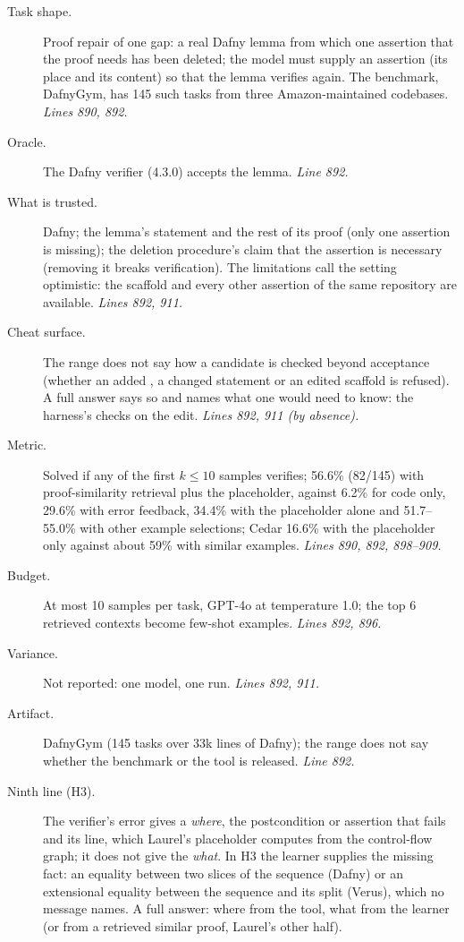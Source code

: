 \documentclass[11pt]{article}
\begin{document}
\begin{description}
\item[Task shape.] Proof repair of one gap: a real Dafny lemma from which one
  assertion that the proof needs has been deleted; the model must supply an
  assertion (its place and its content) so that the lemma verifies again. The
  benchmark, DafnyGym, has 145 such tasks from three Amazon-maintained
  codebases. \emph{Lines 890, 892.}
\item[Oracle.] The Dafny verifier (4.3.0) accepts the lemma. \emph{Line 892.}
\item[What is trusted.] Dafny; the lemma's statement and the rest of its proof
  (only one assertion is missing); the deletion procedure's claim that the
  assertion is necessary (removing it breaks verification). The limitations
  call the setting optimistic: the scaffold and every other assertion of the
  same repository are available. \emph{Lines 892, 911.}
\item[Cheat surface.] The range does not say how a candidate is checked beyond
  acceptance (whether an added , a changed statement or an edited
  scaffold is refused). A full answer says so and names what one would need
  to know: the harness's checks on the edit. \emph{Lines 892, 911 (by
  absence).}
\item[Metric.] Solved if any of the first $k \le 10$ samples verifies; 56.6\%
  (82/145) with proof-similarity retrieval plus the placeholder, against 6.2\%
  for code only, 29.6\% with error feedback, 34.4\% with the placeholder alone
  and 51.7--55.0\% with other example selections; Cedar 16.6\% with the
  placeholder only against about 59\% with similar examples. \emph{Lines 890,
  892, 898--909.}
\item[Budget.] At most 10 samples per task, GPT-4o at temperature 1.0; the
  top 6 retrieved contexts become few-shot examples. \emph{Lines 892, 896.}
\item[Variance.] Not reported: one model, one run. \emph{Lines 892, 911.}
\item[Artifact.] DafnyGym (145 tasks over 33k lines of Dafny); the range does
  not say whether the benchmark or the tool is released. \emph{Line 892.}
\item[Ninth line (H3).] The verifier's error gives a \emph{where}, the
  postcondition or assertion that fails and its line, which Laurel's
  placeholder computes from the control-flow graph; it does not give the
  \emph{what}. In H3 the learner supplies the missing fact: an equality
  between two slices of the sequence (Dafny) or an extensional equality
  between the sequence and its split (Verus), which no message names. A
  full answer: where from the tool, what from the learner (or from a
  retrieved similar proof, Laurel's other half).
\end{description}
\end{document}
